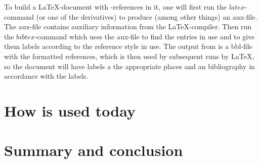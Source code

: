 To build a {\LaTeX}-document with {\bibtex}-references in it, one will
first run the $latex$-command (or one of the derivatives) to produce
(among other things) an aux-file.  The aux-file contains auxiliary
information from the {\LaTeX}-compiler.  Then run the $bibtex$-command
which uses the aux-file to find the entries in use and to give them
labels according to the reference style in use.  The output from
{\bibtex} is a bbl-file with the formatted references, which is then
used by subsequent runs by {\LaTeX}, so the document will have labels
a the appropriate places and an bibliography in accordance with the
labels.

\section{How {\bibtex} is used today}
\label{sec:how_bibtex_is_used_today}


\section{Summary and conclusion}


%
%
